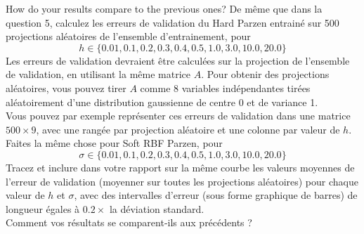 \documentclass[11pt,french,english]{article}
\begin{document}
\begin{enumerate}
{{How do your results compare to the previous ones?}%
{De même que dans la question 5, calculez les erreurs de validation du Hard Parzen entrainé sur 500 projections aléatoires de l'ensemble d'entrainement, pour
$$h \in \{0.01, 0.1, 0.2, 0.3, 0.4, 0.5, 1.0, 3.0, 10.0, 20.0 \}$$
Les erreurs de validation devraient être calculées sur la projection de l'ensemble de validation, en utilisant la même matrice $A$.
Pour obtenir des projections aléatoires, vous pouvez tirer $A$ comme 8 variables indépendantes tirées aléatoirement d'une distribution gaussienne de centre 0 et de variance 1.\\
Vous pouvez par exemple représenter ces erreurs de validation dans une matrice $500 \times 9$, avec une rangée par projection aléatoire et une colonne par valeur de $h$.\\
Faites la même chose pour Soft RBF Parzen, pour
$$\sigma \in \{0.01, 0.1, 0.2, 0.3, 0.4, 0.5, 1.0, 3.0, 10.0, 20.0 \}$$
Tracez et inclure dans votre rapport sur la même courbe les valeurs moyennes de l'erreur de validation (moyenner sur toutes les projections aléatoires) pour chaque valeur de $h$ et $\sigma$, avec des intervalles d'erreur (sous forme graphique de barres) de longueur égales à $0.2\times $ la déviation standard. \\
Comment vos résultats se comparent-ils aux précédents ?
}}
\end{enumerate}
\end{document}
